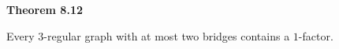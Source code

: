 \nopagenumbers
{\bf Theorem 8.12}
\vskip 6pt

Every $3$-regular graph with at most two bridges contains a $1$-factor.

\vfill\eject
